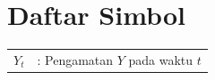 \clearpage

\chapter*{Daftar Simbol}
\thispagestyle{fancy}
\fancyhf{}
\fancyhead[R]{\thepage}

\begin{flushleft}
	\begin{longtable}{p{3cm}p{10cm}}

		$Y_t$             &: Pengamatan $Y$ pada waktu $t$ \\
		
		 \end{longtable}
\end{flushleft}

